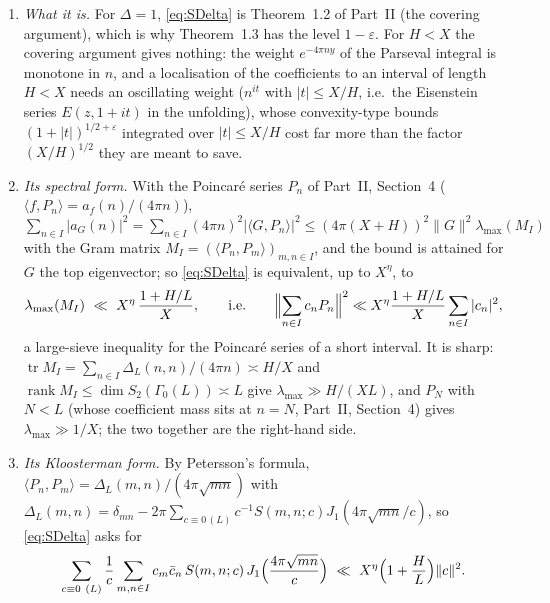 \documentclass[11pt]{amsart}
\theoremstyle{remark}
\newcommand{\e}{\varepsilon}
\DeclareMathOperator{\tr}{tr}
\begin{document}
\begin{enumerate}[label=\textup{(\alph*)},leftmargin=2.2em]
\item \emph{What it is.} For $\Delta=1$, \eqref{eq:SDelta} is Theorem~1.2 of Part~II (the covering argument), which is why Theorem~1.3 has the level $1-\e$. For $H<X$ the covering argument gives nothing: the weight $e^{-4\pi ny}$ of the Parseval integral is monotone in $n$, and a localisation of the coefficients to an interval of length $H<X$ needs an oscillating weight ($n^{it}$ with $|t|\le X/H$, i.e.\ the Eisenstein series $E(z,1+it)$ in the unfolding), whose convexity-type bounds $(1+|t|)^{1/2+\e}$ integrated over $|t|\le X/H$ cost far more than the factor $(X/H)^{1/2}$ they are meant to save.
\item \emph{Its spectral form.} With the Poincar\'e series $P_n$ of Part~II, Section~4 ($\langle f,P_n\rangle=a_f(n)/(4\pi n)$), $\sum_{n\in I}|a_G(n)|^2=\sum_{n\in I}(4\pi n)^2|\langle G,P_n\rangle|^2\le(4\pi(X+H))^2\|G\|^2\lambda_{\max}(M_I)$ with the Gram matrix $M_I=(\langle P_n,P_m\rangle)_{m,n\in I}$, and the bound is attained for $G$ the top eigenvector; so \eqref{eq:SDelta} is equivalent, up to $X^\eta$, to
\[
\lambda_{\max}(M_I)\ \ll\ X^{\eta}\,\frac{1+H/L}{X},\qquad\text{i.e.}\qquad\Bigl\|\sum_{n\in I}c_nP_n\Bigr\|^2\ll X^{\eta}\frac{1+H/L}{X}\sum_{n\in I}|c_n|^2 ,
\]
a large-sieve inequality for the Poincar\'e series of a short interval. It is sharp: $\tr M_I=\sum_{n\in I}\Delta_L(n,n)/(4\pi n)\asymp H/X$ and $\operatorname{rank}M_I\le\dim S_2(\Gamma_0(L))\asymp L$ give $\lambda_{\max}\gg H/(XL)$, and $P_N$ with $N<L$ (whose coefficient mass sits at $n=N$, Part~II, Section~4) gives $\lambda_{\max}\gg1/X$; the two together are the right-hand side.
\item \emph{Its Kloosterman form.} By Petersson's formula, $\langle P_n,P_m\rangle=\Delta_L(m,n)/(4\pi\sqrt{mn})$ with $\Delta_L(m,n)=\delta_{mn}-2\pi\sum_{c\equiv0\,(L)}c^{-1}S(m,n;c)J_1(4\pi\sqrt{mn}/c)$, so \eqref{eq:SDelta} asks for
\[
\sum_{c\equiv0\ (L)}\frac1c\sum_{m,n\in I}c_m\bar c_n\,S(m,n;c)\,J_1\Bigl(\frac{4\pi\sqrt{mn}}c\Bigr)\ \ll\ X^{\eta}\Bigl(1+\frac HL\Bigr)\|c\|^2 .
\]

\end{enumerate}
\end{document}
